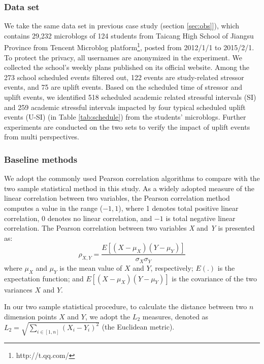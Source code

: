 \subsubsection{Data set}
We take the same data set in previous case study (section \ref{sec:obs}]),
which contains 29,232 microblogs of 124 students from Taicang High School of Jiangsu Province from Tencent Microblog platform\footnote{http://t.qq.com/},  posted from 2012/1/1 to 2015/2/1.
To protect the privacy, all usernames are anonymized in the experiment.
We collected the school's weekly plans published on its official website. %
Among the 273 school scheduled events filtered out,
122 events are study-related stressor events, and 75 are uplift events.
Based on the scheduled time of stressor and uplift events,
we identified 518 scheduled academic related stressful intervals (SI)
and 259 academic stressful intervals impacted by four typical scheduled uplift events (U-SI) (in Table \ref{tab:schedule})
from the students' microblogs.
Further experiments are conducted on the two sets to verify the impact of uplift events from multi perspectives.

\subsubsection{Baseline methods}
We adopt the commonly used Pearson correlation algorithms to compare with the two sample statistical method in this study.
As a widely adopted measure of the linear correlation between two variables,
the Pearson correlation method computes a value in the range ($-1,1$),
where 1 denotes total positive linear correlation,
0 denotes no linear correlation,
and $-1$ is total negative linear correlation.
The Pearson correlation between two variables \emph{X} and \emph{Y} is presented as:
\begin{equation}
\rho_{X,Y} = \frac{E[(X-\mu_X)(Y-\mu_Y)]}{\sigma_X\sigma_Y}
\end{equation}
where $\mu_X$ and $\mu_Y$ is the mean value of $X$ and $Y$, respectively;
$E(.)$ is the expectation function;
and $E[(X-\mu_X)(Y-\mu_Y)]$ is the covariance of the two variances $X$ and $Y$.

In our two sample statistical procedure,
to calculate the distance between two $n$ dimension points $X$ and $Y$,
we adopt the $L_2$ measures,
denoted as $L_2 = \sqrt{\sum_{i\in[1,n]}(X_i-Y_i)^2}$ (the Euclidean metric).

